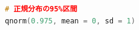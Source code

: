 \begin{lstlisting}[language=c++,label={code:20_04},caption={正規分布の95\%区間}]
# 正規分布の95%区間
qnorm(0.975, mean = 0, sd = 1)
\end{lstlisting}
